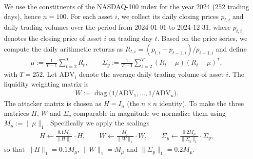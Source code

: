 \documentclass{article}
\begin{document}
	We use the constituents of the NASDAQ-100 index for the year 2024 (252 trading days), hence $n=100$. For each asset $i$, we collect its daily closing prices $p_{t, i}$ and daily trading volumes over the period from 2024-01-01 to 2024-12-31, where $p_{t,i}$ denotes the closing price of asset $i$ on trading day $t$. Based on the price series, we compute the daily arithmetic returns as $R_{t,i}=(p_{t,i}-p_{t-1,i})/p_{t-1,i}$ and define
	\begin{align*}
		\mu := \frac{1}{T - 1}\sum_{t=2}^{T} R_{t}, \qquad
		\Sigma_{y} := \frac{1}{T-1}\sum_{t=2}^{T}(R_{t}-\mu)(R_{t}-\mu)^{T},
	\end{align*}
	with $T=252$. Let $\mathrm{ADV}_{i}$ denote the average daily trading volume of asset $i$. The liquidity weighting matrix is
	\begin{align*}
		W := \operatorname{diag}\big(1/\mathrm{ADV}_{1},\dots,1/\mathrm{ADV}_{n}\big).
	\end{align*}
	The attacker matrix is chosen as $H = I_{n}$ (the $n\times n$ identity). To make the three matrices $H$, $W$ and $\Sigma_{y}$ comparable in magnitude we normalize them using $M_{\mu}:=\|\mu\|_{1}$. Specifically we apply the scalings
	\begin{align*}
		H \leftarrow\frac{0.1M_{\mu}}{\|H\|_{1}} \cdot H,\qquad
		W \leftarrow \frac{M_{\mu}}{\|W\|_{1}} \cdot W,\qquad
		\Sigma_{y}\leftarrow \frac{0.2M_{\mu}}{\|\Sigma_{y}\|_{1}} \cdot \Sigma_{y},
	\end{align*}
	so that $\|H\|_{1}=0.1M_{\mu}$, $\|W\|_{1}=M_{\mu}$ and $\|\Sigma_{y}\|_{1}=0.2M_{\mu}$.
	
\end{document}

